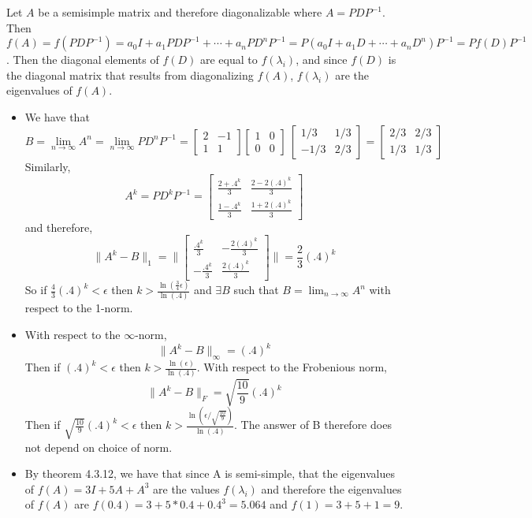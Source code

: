 \documentclass[12pt]{article}
\newenvironment{problem}[2][Problem]{\begin{trivlist}
\item[\hskip \labelsep {\bfseries #1}\hskip \labelsep {\bfseries #2}]}{\end{trivlist}}
\begin{document}
\begin{problem}{15.} 
Let $A$ be a semisimple matrix and therefore diagonalizable where $A = PDP^{-1}$. Then $
f(A)  = f(PDP^{-1})=a_0I + a_1PDP^{-1}+\cdots+a_nPD^nP^{-1} = P(a_0I+a_1D+\cdots+a_nD^n)P^{-1} =Pf(D)P^{-1}$.
Then the diagonal elements of $f(D)$  are equal to $f(\lambda_i)$, and since $f(D)$ is the diagonal matrix that results from diagonalizing $f(A)$,  $f(\lambda_i)$ are the eigenvalues of $f(A)$.
\end{problem}

\begin{problem}{16.} \hfill
\begin{itemize}
\item [(i)] We have that $$B = \lim_{n\to\infty}A^n = \lim_{n\to\infty}PD^nP^{-1} = \begin{bmatrix}
        2 & -1 \\
        1 & 1
      \end{bmatrix}\begin{bmatrix}
        1 & 0 \\
        0 & 0
        \end{bmatrix}\
        \begin{bmatrix}
        1/3 & 1/3 \\
        -1/3 & 2/3
      \end{bmatrix} = 
      \begin{bmatrix}
        2/3 & 2/3 \\
        1/3 & 1/3
      \end{bmatrix}
$$
Similarly, 
$$A^k = PD^kP^{-1} = \begin{bmatrix}
        \frac{2+.4^k}{3} & \frac{2-2(.4)^k}{3} \\
        \frac{1-.4^k}{3} &  \frac{1+2(.4)^k}{3}
      \end{bmatrix}$$
and therefore, 
$$\|A^k - B \|_1 = \| \begin{bmatrix}
        \frac{.4^k}{3} & -\frac{2(.4)^k}{3} \\
        -\frac{.4^k}{3} &  \frac{2(.4)^k}{3}
      \end{bmatrix} \|  = \frac{2}{3}(.4)^k $$
So if $\frac{4}{3}(.4)^k < \epsilon$ then $k > \frac{\ln(\frac{3}{4}\epsilon)}{\ln(.4)}$ and $\exists B$ such that $B = \lim_{n\to\infty}A^n$ with respect to the 1-norm. 
\item [(ii)] With respect to the $\infty$-norm,  
$$\|A^k - B \|_\infty =(.4)^k$$
Then if $(.4)^k < \epsilon$ then $k > \frac{\ln(\epsilon)}{\ln(.4)}$. 
With respect to the Frobenious norm, 
$$\|A^k - B \|_F =\sqrt{\frac{10}{9}}(.4)^k$$
Then if $\sqrt{\frac{10}{9}}(.4)^k< \epsilon$ then $k > \frac{\ln(\epsilon/ \sqrt{\frac{10}{9}})}{\ln(.4)}$. 
The answer of B therefore does not depend on choice of norm. 
\item [(iii)] By theorem 4.3.12, we have that since A is semi-simple, that the eigenvalues of $f(A) = 3I + 5A+A^3$ are the values $f(\lambda_i)$ and therefore the eigenvalues of $f(A)$ are $f(0.4) = 3+ 5*0.4 + 0.4^3 = 5.064$ and $f(1) = 3+ 5 +1 = 9$. 
\end{itemize}
\end{problem}
\end{document}
